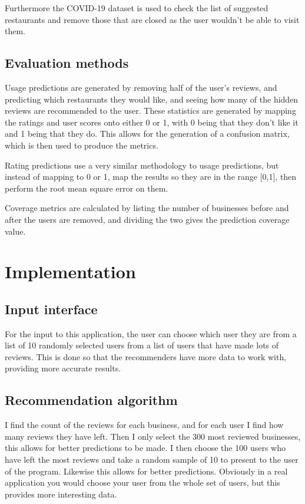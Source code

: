 \documentclass[conference]{IEEEtran}
\begin{document}
Furthermore the COVID-19 dataset is used to check the list of suggested restaurants and remove those that are closed as the user wouldn't be able to visit them.

\subsection{Evaluation methods}

Usage predictions are generated by removing half of the user's reviews, and predicting which restaurants they would like, and seeing how many of the hidden reviews are recommended to the user. These statistics are generated by mapping the ratings and user scores onto either 0 or 1, with 0 being that they don't like it and 1 being that they do. This allows for the generation of a confusion matrix, which is then used to produce the metrics.

Rating predictions use a very similar methodology to usage predictions, but instead of mapping to 0 or 1, map the results so they are in the range [0,1], then perform the root mean square error on them. 

Coverage metrics are calculated by listing the number of businesses before and after the users are removed, and dividing the two gives the prediction coverage value.


\section{Implementation}

\subsection{Input interface}

For the input to this application, the user can choose which user they are from a list of 10 randomly selected users from a list of users that have made lots of reviews. This is done so that the recommenders have more data to work with, providing more accurate results.

\subsection{Recommendation algorithm}

I find the count of the reviews for each business, and for each user I find how many reviews they have left. Then I only select the 300 most reviewed businesses, this allows for better predictions to be made. I then choose the 100 users who have left the most reviews and take a random sample of 10 to present to the user of the program. Likewise this allows for better predictions. Obviously in a real application you would choose your user from the whole set of users, but this provides more interesting data.
\end{document}

